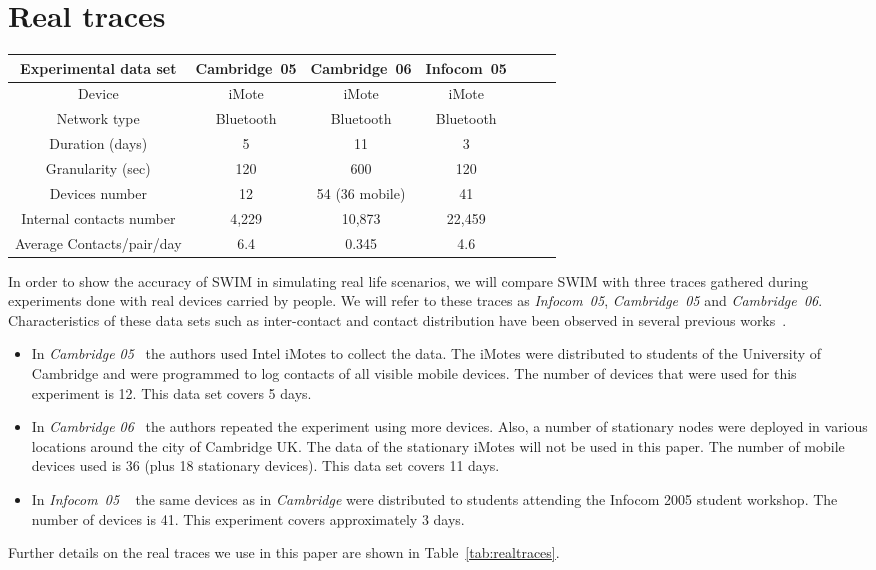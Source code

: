 \documentclass[conference]{IEEEtran}
\newcommand\T{\rule{0pt}{2.6ex}}
\newcommand\B{\rule[-1.2ex]{0pt}{0pt}}
\begin{document}
\section{Real traces}
\begin{table*}
\begin{center}
\begin{tabular}{|c|c|c|c|c|c|c|}
\hline
Experimental data set \T \B & Cambridge~05 & Cambridge~06 & Infocom~05\\ \hline
Device \T & iMote & iMote & iMote\\
Network type & Bluetooth & Bluetooth & Bluetooth\\
Duration (days)& 5 & 11 & 3\\
Granularity (sec)& 120 & 600 & 120\\
Devices number & 12 & 54 (36 mobile) & 41\\
Internal contacts number& 4,229 & 10,873 & 22,459\\
Average Contacts/pair/day & 6.4 & 0.345 & 4.6\\[1mm] \hline
\end{tabular}
\caption{The three experimental data sets}
\label{tab:realtraces}
\end{center}
\end{table*}

In order to show the accuracy of SWIM in simulating real life scenarios, we will
compare SWIM with three traces gathered during experiments done with real
devices carried by people. We will refer to these traces as \emph{Infocom~05},
\emph{Cambridge~05} and \emph{Cambridge~06}. Characteristics of these data sets
such as inter-contact and contact distribution have been observed in several
previous works~\cite{hui05, leguay06,hui06}.
\begin{itemize}
\item In \emph{Cambridge 05}~\cite{cambridge05} the authors used Intel iMotes to
collect the data. The iMotes were distributed to students of the University of
Cambridge and were programmed to log contacts of all visible mobile devices. The
number of devices that were used for this experiment is 12. This data set covers
5 days.
\item In \emph{Cambridge 06}~\cite{upmcCambridgeData} the authors repeated the
experiment using more devices. Also, a number of stationary nodes were deployed
in various locations around the city of Cambridge UK. The data of the stationary
iMotes will not be used in this paper. The number of mobile devices used is 36
(plus 18 stationary devices). This data set covers 11 days.
\item In \emph{Infocom~05} ~\cite{cambridgeInfocomData} the same devices as in
\emph{Cambridge} were distributed to students attending the Infocom 2005 student
workshop. The number of devices is 41. This experiment covers approximately 3
days.
\end{itemize}
Further details on the real traces we use in this paper are shown in
Table~\ref{tab:realtraces}.
\end{document}

